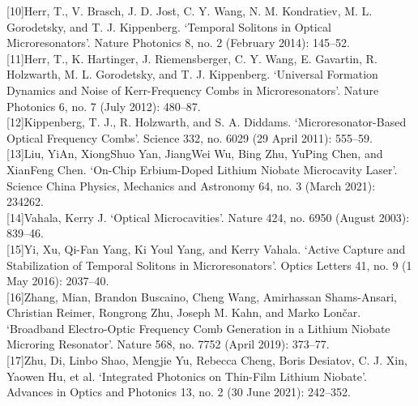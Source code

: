 [10]Herr, T., V. Brasch, J. D. Jost, C. Y. Wang, N. M. Kondratiev, M. L. Gorodetsky, and T. J. Kippenberg. ‘Temporal Solitons in Optical Microresonators’. Nature Photonics 8, no. 2 (February 2014): 145–52. \\


[11]Herr, T., K. Hartinger, J. Riemensberger, C. Y. Wang, E. Gavartin, R. Holzwarth, M. L. Gorodetsky, and T. J. Kippenberg. ‘Universal Formation Dynamics and Noise of Kerr-Frequency Combs in Microresonators’. Nature Photonics 6, no. 7 (July 2012): 480–87. \\


[12]Kippenberg, T. J., R. Holzwarth, and S. A. Diddams. ‘Microresonator-Based Optical Frequency Combs’. Science 332, no. 6029 (29 April 2011): 555–59. \\


[13]Liu, YiAn, XiongShuo Yan, JiangWei Wu, Bing Zhu, YuPing Chen, and XianFeng Chen. ‘On-Chip Erbium-Doped Lithium Niobate Microcavity Laser’. Science China Physics, Mechanics and Astronomy 64, no. 3 (March 2021): 234262. \\


[14]Vahala, Kerry J. ‘Optical Microcavities’. Nature 424, no. 6950 (August 2003): 839–46. \\


[15]Yi, Xu, Qi-Fan Yang, Ki Youl Yang, and Kerry Vahala. ‘Active Capture and Stabilization of Temporal Solitons in Microresonators’. Optics Letters 41, no. 9 (1 May 2016): 2037–40. \\


[16]Zhang, Mian, Brandon Buscaino, Cheng Wang, Amirhassan Shams-Ansari, Christian Reimer, Rongrong Zhu, Joseph M. Kahn, and Marko Lončar. ‘Broadband Electro-Optic Frequency Comb Generation in a Lithium Niobate Microring Resonator’. Nature 568, no. 7752 (April 2019): 373–77. \\


[17]Zhu, Di, Linbo Shao, Mengjie Yu, Rebecca Cheng, Boris Desiatov, C. J. Xin, Yaowen Hu, et al. ‘Integrated Photonics on Thin-Film Lithium Niobate’. Advances in Optics and Photonics 13, no. 2 (30 June 2021): 242–352. \\
